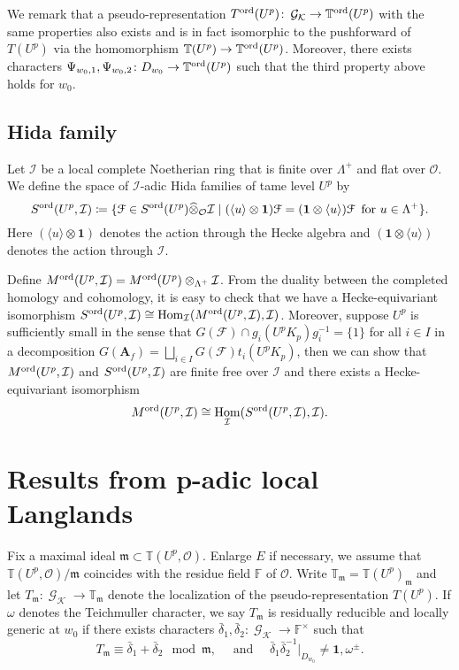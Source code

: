 \documentclass[leqno]{amsart}
\theoremstyle{definition}
\theoremstyle{remark}
\newcommand{\id}{\mathbf{1}}
\newcommand{\oo}{\mathcal{O}}
\newcommand{\fF}{\mathbb{F}} %
\newcommand{\A}{\mathbf A}
\DeclareMathOperator{\Hom}{Hom}
\DeclareMathOperator{\Gal}{\mathcal{G}}
\newcommand{\fm}{\mathfrak{m}}
\newcommand{\F}{{\mathcal{F}}} %
\newcommand{\K}{{\mathcal{K}}} %
\newcommand{\TT}{\mathbb{T}} %
\newcommand{\euF}{\EuScript{F}} %
\newcommand{\I}{\mathcal{I}} %
\newcommand{\ord}{\textnormal{ord}} %
\begin{document}
We remark that a pseudo-representation
$T^{\ord}(U^p)\colon \Gal_\K\to \TT^{\ord}(U^p)$ 
with the same properties also exists and is in fact 
isomorphic to the pushforward of $T(U^p)$ via the homomorphism
$\TT(U^p)\to\TT^{\ord}(U^p)$.
Moreover, there exists characters
$\Psi_{w_0,1},\Psi_{w_0,2}\colon D_{w_0}\to \TT^{\ord}(U^p)$
such that the third property above holds for $w_0$.


\subsection{Hida family}

Let $\I$ be a local complete Noetherian ring
that is finite over $\Lambda^+$ and flat over $\oo$.
We define the space of $\I$-adic Hida families of tame level $U^p$ by
\begin{equation*}
    S^{\ord}(U^p,\I)\coloneqq 
    \{\euF\in S^{\ord}(U^p)\widehat{\otimes}_\oo\I\mid 
    (\langle u\rangle\otimes\id)\euF=
    (\id\otimes\langle u\rangle)\euF\, \text{ for }
    u\in \Lambda^+\}.
\end{equation*}
Here $(\langle u\rangle\otimes\id)$ denotes
the action through the Hecke algebra and
$(\id\otimes\langle u\rangle)$ denotes the action through $\I$.

Define $M^{\ord}(U^p,\I)=M^{\ord}(U^p)\otimes_{\Lambda^+}\I$.
From the duality between the completed homology and cohomology,
it is easy to check that we have a Hecke-equivariant isomorphism
$S^{\ord}(U^p,\I)\cong\Hom_\I(M^{\ord}(U^p,\I), \I)$.
Moreover, suppose $U^p$ is sufficiently small in the sense that
$G(\F)\cap g_i(U^pK_p)g_i^{-1}=\{1\}$ for all $i\in I$ in 
a decomposition $G(\A_f)=\bigsqcup_{i\in I} G(\F)t_i (U^pK_p)$,
then we can show that $M^{\ord}(U^p,\I)$ and $S^{\ord}(U^p,\I)$
are finite free over $\I$ 
and there exists a Hecke-equivariant isomorphism
\[
    M^{\ord}(U^p,\I)\cong \Hom_\I(S^{\ord}(U^p,\I),\I).
\]


\section{Results from p-adic local Langlands}

Fix a maximal ideal $\fm\subset \TT(U^p,\oo)$.
Enlarge $E$ if necessary, we assume that 
$\TT(U^p,\oo)/\fm$ coincides with the residue field $\fF$ of $\oo$.
Write $\TT_\fm=\TT(U^p)_\fm$ and let
$T_\fm\colon\Gal_\K\to \TT_\fm$ denote the localization of 
the pseudo-representation $T(U^p)$.
If $\omega$ denotes the Teichmuller character,
we say $T_{\fm}$ is residually reducible and locally generic at $w_0$
if there exists characters
$\bar{\delta}_1, \bar{\delta}_2\colon \Gal_{\K}\to \fF^\times$
such that 
\begin{equation}\tag{red.gen}\label{cond:red_gen}
	T_\fm\equiv \bar{\delta}_1+\bar{\delta}_2
	\mod \fm,\quad
    \text{ and }\quad
	\bar{\delta}_1\bar{\delta}_2^{-1} \vert_{D_{w_0}}
	\neq \id,\omega^{\pm}.
\end{equation}
\end{document}
